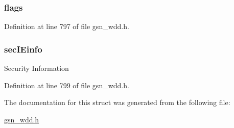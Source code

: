 \hypertarget{a00273_a840dc184661c79f2e8731798ea9aea03}{
\subsubsection[{flags}]{ {\bf flags}}}
\label{a00273_a840dc184661c79f2e8731798ea9aea03}


Definition at line 797 of file gsn\_\-wdd.h.

\hypertarget{a00273_ad69e2cfc109b18b97d32417ce1ad2dd7}{
\subsubsection[{secIEinfo}]{ {\bf secIEinfo}}}
\label{a00273_ad69e2cfc109b18b97d32417ce1ad2dd7}
Security Information 

Definition at line 799 of file gsn\_\-wdd.h.



The documentation for this struct was generated from the following file:\begin{DoxyCompactItemize}
\item 
\hyperlink{a00603}{gsn\_\-wdd.h}\end{DoxyCompactItemize}
